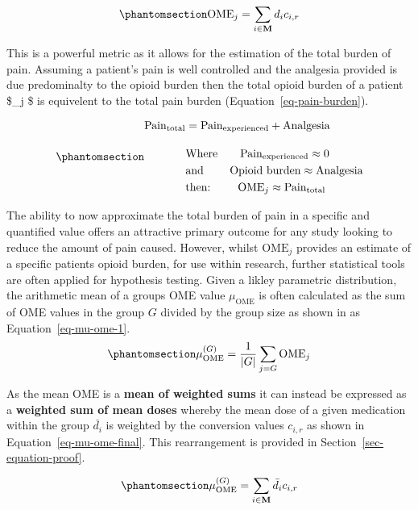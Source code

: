 \documentclass[
  letterpaper,
  DIV=11,
  numbers=noendperiod]{scrreprt}
\begin{document}
\begin{equation}\phantomsection\label{eq-ome}{\text{OME}_j = \sum_{i\in\mathbf{M}} d_i c_{i,r}
}\end{equation}

This is a powerful metric as it allows for the estimation of the total
burden of pain. Assuming a patient's pain is well controlled and the
analgesia provided is due predominalty to the opioid burden then the
total opioid burden of a patient \$\_j \$ is equivelent to the
total pain burden (Equation~\ref{eq-pain-burden}).

\begin{equation}\phantomsection\label{eq-pain-burden}{
\begin{align}
\text{Pain}_{\text{total}} &= \text{Pain}_{\text{experienced}} + \text{Analgesia} \\[1em]
& \text{Where} \qquad  \text{Pain}_{\text{experienced}} \approx 0 \\
& \text{and }  \qquad \text{Opioid burden} \approx \text{Analgesia} \\
& \text{then: }  \qquad  \text{OME}_j   \approx \text{Pain}_{\text{total}}
\end{align}
}\end{equation}

The ability to now approximate the total burden of pain in a specific
and quantified value offers an attractive primary outcome for any study
looking to reduce the amount of pain caused. However, whilst
\(\text{OME}_j\) provides an estimate of a specific patients opioid
burden, for use within research, further statistical tools are often
applied for hypothesis testing. Given a likley parametric distribution,
the arithmetic mean of a groups OME value \(\mu_{\text{OME}}\) is often
calculated as the sum of OME values in the group \(G\) divided by the
group size as shown in as Equation~\ref{eq-mu-ome-1}.
\begin{equation}\phantomsection\label{eq-mu-ome-1}{
\mu_{\text{OME}}^{(G)} = \frac{1}{|G|} \sum_{j=G} \text{OME}_j
}\end{equation}

As the mean OME is a \textbf{mean of weighted sums} it can instead be
expressed as a \textbf{weighted sum of mean doses} whereby the mean dose
of a given medication within the group \(\bar{d_i}\) is weighted by the
conversion values \(c_{i,r}\) as shown in
Equation~\ref{eq-mu-ome-final}. This rearrangement is provided in
Section~\ref{sec-equation-proof}.

\begin{equation}\phantomsection\label{eq-mu-ome-final}{\mu_{\text{OME}}^{(G)}  = \sum_{i\in\mathbf{M}} \bar{d_{i}} c_{i,r} 
}\end{equation}
\end{document}
